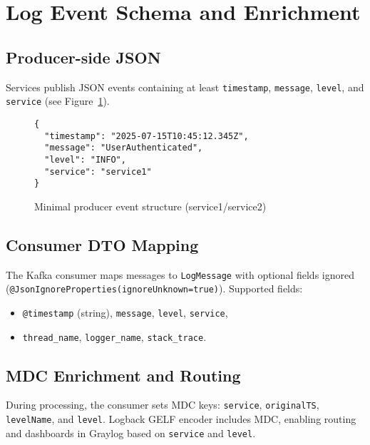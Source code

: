 \documentclass[12pt,a4paper]{report}
\begin{document}
\section{Log Event Schema and Enrichment}
\subsection{Producer-side JSON}
Services publish JSON events containing at least \texttt{timestamp}, \texttt{message}, \texttt{level}, and \texttt{service} (see Figure~\ref{fig:service-json}).

\begin{figure}[H]
\centering
\begin{Verbatim}[frame=single, fontsize=\small, xleftmargin=1cm, xrightmargin=1cm]
{
  "timestamp": "2025-07-15T10:45:12.345Z",
  "message": "UserAuthenticated",
  "level": "INFO",
  "service": "service1"
}
\end{Verbatim}
\caption{Minimal producer event structure (service1/service2)}
\label{fig:service-json}
\end{figure}

\subsection{Consumer DTO Mapping}
The Kafka consumer maps messages to \texttt{LogMessage} with optional fields ignored (\texttt{@JsonIgnoreProperties(ignoreUnknown=true)}). Supported fields:
\begin{itemize}[leftmargin=1.2cm]
  \item \texttt{@timestamp} (string), \texttt{message}, \texttt{level}, \texttt{service},
  \item \texttt{thread\_name}, \texttt{logger\_name}, \texttt{stack\_trace}.
\end{itemize}

\subsection{MDC Enrichment and Routing}
During processing, the consumer sets MDC keys: \texttt{service}, \texttt{originalTS}, \texttt{levelName}, and \texttt{level}. Logback GELF encoder includes MDC, enabling routing and dashboards in Graylog based on \texttt{service} and \texttt{level}.
\end{document}

